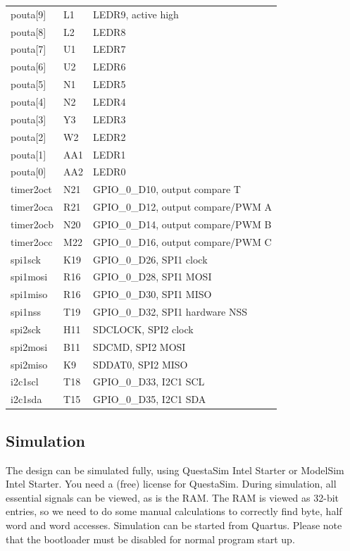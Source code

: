 \documentclass[12pt]{article}
\begin{document}
\begin{longtable}{lll}
pouta[9]  & L1       & LEDR9, active high \\
pouta[8]  & L2       & LEDR8 \\
pouta[7]  & U1       & LEDR7 \\
pouta[6]  & U2       & LEDR6 \\
pouta[5]  & N1       & LEDR5 \\
pouta[4]  & N2       & LEDR4 \\
pouta[3]  & Y3       & LEDR3 \\
pouta[2]  & W2       & LEDR2 \\
pouta[1]  & AA1      & LEDR1 \\
pouta[0]  & AA2      & LEDR0 \\
timer2oct & N21      & GPIO\_0\_D10, output compare T \\
timer2oca & R21      & GPIO\_0\_D12, output compare/PWM A \\
timer2ocb & N20      & GPIO\_0\_D14, output compare/PWM B \\
timer2occ & M22      & GPIO\_0\_D16, output compare/PWM C \\
spi1sck   & K19      & GPIO\_0\_D26, SPI1 clock \\
spi1mosi  & R16      & GPIO\_0\_D28, SPI1 MOSI \\
spi1miso  & R16      & GPIO\_0\_D30, SPI1 MISO \\
spi1nss   & T19      & GPIO\_0\_D32, SPI1 hardware NSS \\
spi2sck   & H11      & SDCLOCK, SPI2 clock \\
spi2mosi  & B11      & SDCMD, SPI2 MOSI \\
spi2miso  & K9       & SDDAT0, SPI2 MISO \\
i2c1scl   & T18      & GPIO\_0\_D33, I2C1 SCL \\
i2c1sda   & T15      & GPIO\_0\_D35, I2C1 SDA
\end{longtable}

\subsection{Simulation}
The design can be simulated fully, using QuestaSim Intel Starter or ModelSim Intel Starter. You need a (free) license for QuestaSim. During simulation, all essential signals can be viewed, as is the RAM. The RAM is viewed as 32-bit entries, so we need to do some manual calculations to correctly find byte, half word and word accesses. Simulation can be started from Quartus. Please note that the bootloader must be disabled for normal program start up. 
\end{document}
